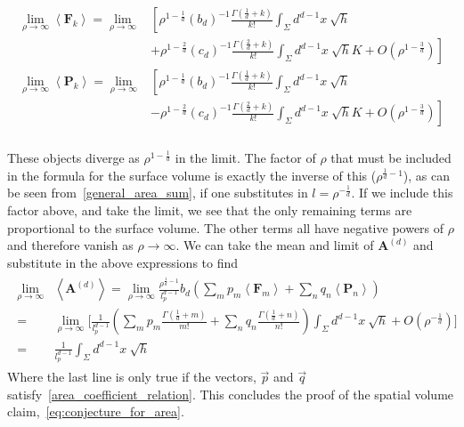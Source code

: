 \documentclass[12pt]{article}
\newcommand{\BF}[1]{\mathbf{F}_{#1}}
\newcommand{\BP}[1]{\mathbf{P}_{#1}}
\begin{document}
\begin{gather}\label{eq:nmax_nmin_final}
\begin{aligned}
\lim_{\rho\rightarrow\infty}\left\langle \BF{k}\right\rangle = \lim_{\rho\rightarrow\infty} & \left[ \rho^{1-\frac{1}{d}} \left (b_d\right)^{-1} \frac{\Gamma\left (\frac{1}{d}+k\right)}{k!}
\int_{\Sigma}d^{d-1}x\: \sqrt{h} \right.
 \\
 &  \left. +\rho^{1-\frac{2}{d}} \left (c_d\right)^{-1} \frac{\Gamma\left (\frac{2}{d}+k\right)}{k!}
\int_{\Sigma}d^{d-1}x\: \sqrt{h}K + O\left (\rho^{1-\frac{3}{d}} \right) \right]
\\
\lim_{\rho\rightarrow\infty}\left\langle \BP{k}\right\rangle = \lim_{\rho\rightarrow\infty} & \left[ \rho^{1-\frac{1}{d}} \left (b_d\right)^{-1} \frac{\Gamma\left (\frac{1}{d}+k\right)}{k!}
\int_{\Sigma}d^{d-1}x\: \sqrt{h} \right.
 \\
 &  \left. -\rho^{1-\frac{2}{d}} \left (c_d\right)^{-1} \frac{\Gamma\left (\frac{2}{d}+k\right)}{k!}
\int_{\Sigma}d^{d-1}x\: \sqrt{h}K + O\left (\rho^{1-\frac{3}{d}} \right) \right]
\\
\end{aligned}
\end{gather}

These objects diverge as $\rho^{1-\frac{1}{d}}$ in the limit. The factor of $\rho$ that must be included in the formula for the surface volume is exactly the inverse of this ($\rho^{\frac{1}{d}-1}$), as can be seen from~\eqref{general_area_sum}, if one substitutes in $l=\rho^{-\frac{1}{d}}$. If we include this factor above, and take the limit, we see that the only remaining terms are proportional to the surface volume. The other terms all have negative powers of $\rho$ and therefore vanish as $\rho\rightarrow\infty$. We can take the mean and limit of $\textbf{A}^{ (d)}$ and substitute in the above expressions to find
\begin{gather}\label{eq:area_final_proof}
\begin{aligned}
\lim_{\rho\rightarrow\infty} & \left\langle \textbf{A}^{ (d)}\right\rangle = \lim_{\rho\rightarrow\infty} \frac{\rho^{\frac{1}{d}-1}}{l_p^{d-1}} b_{d}\left (\sum_m p_m \left\langle\textbf{F}_m\right\rangle  + \sum_n q_n \left\langle\textbf{P}_n\right\rangle\right)
\\
= & \lim_{\rho\rightarrow\infty}\Bigg[ \frac{1}{l_p^{d-1}} \left(\sum_m p_m \frac{\Gamma\left (\frac{1}{d}+m \right)}{m!}  + \sum_n q_n\frac{\Gamma\left (\frac{1}{d}+n \right)}{n!} \right) \int_{\Sigma}d^{d-1}x\: \sqrt{h}+O(\rho^{-\frac{1}{d}})\Bigg]
\\
= & \frac{1}{l_p^{d-1}}\int_{\Sigma}d^{d-1}x\: \sqrt{h}
\end{aligned}
\end{gather}
Where the last line is only true if the vectors, $\vec{p}$ and $\vec{q}$ satisfy~\eqref{area_coefficient_relation}. This concludes the proof of the spatial volume claim,~\eqref{eq:conjecture_for_area}. 
\end{document}
